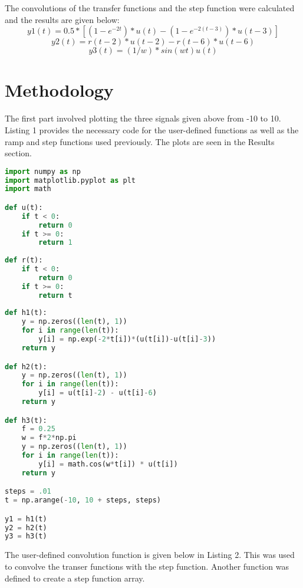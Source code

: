 \documentclass[12pt]{report}
\begin{document}
The convolutions of the transfer functions and the step function were calculated and the results are given below:
\begin{equation*}
    y1(t) = 0.5*[(1-e^{-2t})*u(t) - (1 - e^{-2(t-3)})*u(t-3)]
\end{equation*}
\begin{equation*}
    y2(t) = r(t-2)*u(t-2) - r(t-6)*u(t-6)
\end{equation*}
\begin{equation*}
    y3(t) = (1/w)*sin(wt)u(t)
\end{equation*}

\section{Methodology}
The first part involved plotting the three signals given above from -10 to 10. Listing 1 provides the necessary code for the user-defined functions as well as the ramp and step functions used previously. The plots are seen in the Results section.
\begin{lstlisting}[language=Python, caption=Defining the functions to plot the three signals from -10 \textless{} t \textless{} 10]
import numpy as np
import matplotlib.pyplot as plt
import math

def u(t):
    if t < 0:
        return 0
    if t >= 0:
        return 1
    
def r(t):
    if t < 0:
        return 0
    if t >= 0:
        return t
    
def h1(t):
    y = np.zeros((len(t), 1))
    for i in range(len(t)):
        y[i] = np.exp(-2*t[i])*(u(t[i])-u(t[i]-3))
    return y

def h2(t):
    y = np.zeros((len(t), 1))
    for i in range(len(t)):
        y[i] = u(t[i]-2) - u(t[i]-6)
    return y

def h3(t):
    f = 0.25
    w = f*2*np.pi
    y = np.zeros((len(t), 1))
    for i in range(len(t)):
        y[i] = math.cos(w*t[i]) * u(t[i])
    return y

steps = .01
t = np.arange(-10, 10 + steps, steps)

y1 = h1(t)
y2 = h2(t)
y3 = h3(t)
\end{lstlisting}

The user-defined convolution function is given below in Listing 2. This was used to convolve the transer functions with the step function. Another function was defined to create a step function array.
\end{document}
